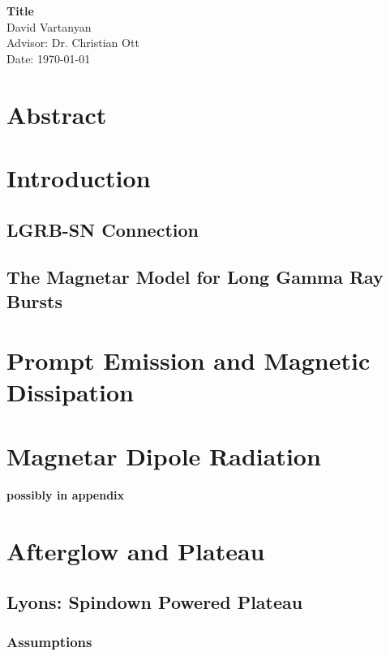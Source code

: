 \documentclass[11pt,letterpaper]{article}
\begin{document}
\raggedright


\begin{center}
\Huge
\vspace*{7 cm}
{\bf Title}\\
\vspace{5 cm}
\large
David Vartanyan\\
Advisor: Dr. Christian Ott\\
Date: \today
\end{center}

\newpage

\section{Abstract}

\section{Introduction}

\subsection{LGRB-SN Connection}

\subsection{The Magnetar Model for Long Gamma Ray Bursts}

\section{Prompt Emission and Magnetic Dissipation}

\section{Magnetar Dipole Radiation}
{\bf possibly in appendix}

\section{Afterglow and Plateau}

\subsection{Lyons: Spindown Powered Plateau}

\subsubsection{Assumptions}
\end{document}
